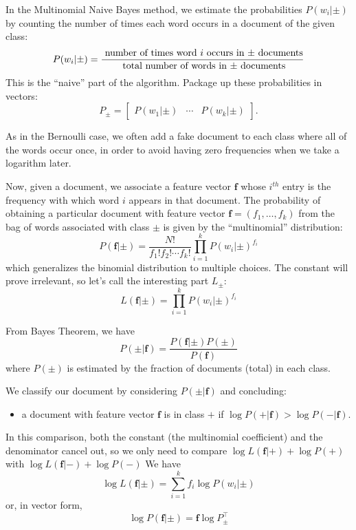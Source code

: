 \documentclass[
  11pt,
  letterpaper,
]{scrbook}
\providecommand{\tightlist}{%
  \setlength{\itemsep}{0pt}\setlength{\parskip}{0pt}}\usepackage{longtable,booktabs,array}
\theoremstyle{plain}
\theoremstyle{plain}
\theoremstyle{remark}
\begin{document}
In the Multinomial Naive Bayes method, we estimate the probabilities
\(P(w_{i}|\pm)\) by counting the number of times each word occurs in a
document of the given class: \[
P(w_{i}|\pm) = \frac{\hbox{ number of times word $i$ occurs in $\pm$ documents}}{\hbox{ total number of words in $\pm$ documents}}
\] This is the ``naive'' part of the algorithm. Package up these
probabilities in vectors: \[
P_{\pm} = \left[\begin{array}{ccc} P(w_{1}|\pm) & \cdots & P(w_{k}|\pm)\end{array}\right].
\]

As in the Bernoulli case, we often add a fake document to each class
where all of the words occur once, in order to avoid having zero
frequencies when we take a logarithm later.

Now, given a document, we associate a feature vector \(\mathbf{f}\)
whose \(i^{th}\) entry is the frequency with which word \(i\) appears in
that document. The probability of obtaining a particular document with
feature vector \(\mathbf{f}=(f_1,\ldots, f_k)\) from the bag of words
associated with class \(\pm\) is given by the ``multinomial''
distribution: \[
P(\mathbf{f}|\pm)=\frac{N!}{f_1!f_2!\cdots f_k!} \prod_{i=1}^{k} P(w_{i}|\pm)^{f_{i}}
\] which generalizes the binomial distribution to multiple choices. The
constant will prove irrelevant, so let's call the interesting part
\(L_{\pm}\): \[
L(\mathbf{f}|\pm)= \prod_{i=1}^{k} P(w_{i}|\pm)^{f_{i}}
\]

From Bayes Theorem, we have \[
P(\pm|\mathbf{f}) = \frac{P(\mathbf{f}|\pm)P(\pm)}{P(\mathbf{f})}
\] where \(P(\pm)\) is estimated by the fraction of documents (total) in
each class.

We classify our document by considering \(P(\pm|\mathbf{f})\) and
concluding:

\begin{itemize}
\tightlist
\item
  a document with feature vector \(\mathbf{f}\) is in class \(+\) if
  \(\log P(+|\mathbf{f})>\log P(-|\mathbf{f})\).
\end{itemize}

In this comparison, both the constant (the multinomial coefficient) and
the denominator cancel out, so we only need to compare
\(\log L(\mathbf{f}|+)+\log P(+)\) with
\(\log L(\mathbf{f}|-)+\log P(-)\) We have \[
\log L(\mathbf{f}|\pm) = \sum_{i=1}^{k} f_{i}\log P(w_{i}|\pm)
\] or, in vector form, \[
\log P(\mathbf{f}|\pm) = \mathbf{f}\log P_{\pm}^{\intercal}
\]
\end{document}
